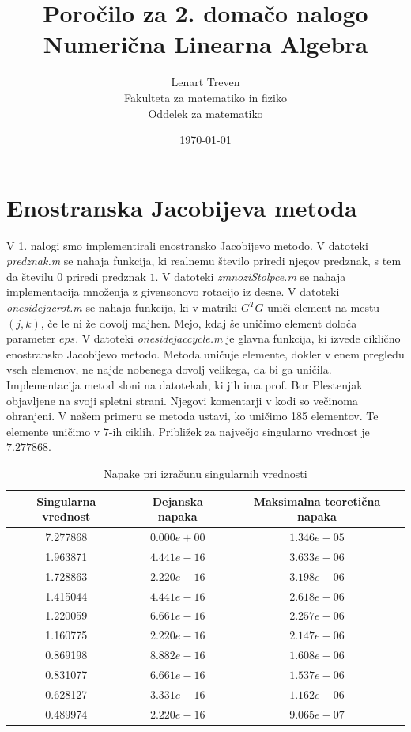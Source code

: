 \documentclass[a4paper,12pt]{article}
\title{Poročilo za 2. domačo nalogo  \\ 
\Large Numerična Linearna Algebra}
\author{Lenart Treven \\
Fakulteta za matematiko in fiziko \\
Oddelek za matematiko}
\date{\today}
\begin{document}


\maketitle

\section{Enostranska Jacobijeva metoda}
V 1. nalogi smo implementirali enostransko Jacobijevo metodo. V datoteki \emph{predznak.m} se nahaja funkcija, ki realnemu število priredi njegov predznak, s tem da številu $0$ priredi predznak $1$.  V datoteki \emph{zmnoziStolpce.m} se nahaja implementacija množenja z givensonovo rotacijo iz desne. V datoteki \emph{onesidejacrot.m} se nahaja funkcija, ki v matriki $G^TG$ uniči element na mestu $(j, k)$, če le ni že dovolj majhen. Mejo, kdaj še uničimo element določa parameter $eps$. V datoteki \emph{onesidejaccycle.m} je glavna funkcija, ki izvede ciklično enostransko Jacobijevo metodo. Metoda uničuje elemente, dokler v enem pregledu vseh elemenov, ne najde nobenega dovolj velikega, da bi ga uničila. Implementacija metod sloni na datotekah, ki jih ima prof. Bor Plestenjak objavljene na svoji spletni strani. Njegovi komentarji v kodi so večinoma ohranjeni.  V našem primeru se metoda ustavi, ko uničimo 185 elementov. Te elemente uničimo v $7$-ih ciklih. Približek za največjo singularno vrednost je $7.277868$.

\begin{table}[h!!!]
	\centering
	\caption{Napake pri izračunu singularnih vrednosti}
	\label{my-label}
	\begin{tabular}{|c|c|c|}
		\hline
		Singularna vrednost & Dejanska napaka & Maksimalna teoretična napaka \\ \hline \hline
		7.277868            & $0.000e+00$     & $1.346e-05$                  \\ \hline
		1.963871            & $4.441e-16$     & $3.633e-06$                  \\ \hline
		1.728863            & $2.220e-16$     & $3.198e-06$                  \\ \hline
		1.415044            & $4.441e-16$     & $2.618e-06$                  \\ \hline
		1.220059            & $6.661e-16$     & $2.257e-06$                  \\ \hline
		1.160775            & $2.220e-16$     & $2.147e-06$                  \\ \hline
		0.869198            & $8.882e-16$     & $1.608e-06$                  \\ \hline
		0.831077            & $6.661e-16$     & $1.537e-06$                  \\ \hline
		0.628127            & $3.331e-16$     & $1.162e-06$                  \\ \hline
		0.489974            & $2.220e-16$     & $9.065e-07$                  \\ \hline
	\end{tabular}
\end{table}
\newpage
\end{document}
